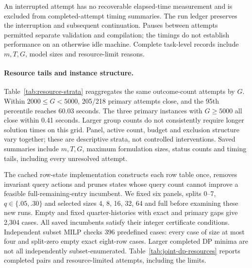 An interrupted attempt has no recoverable elapsed-time measurement and is excluded from completed-attempt timing summaries. The run ledger preserves the interruption and subsequent continuation. Pauses between attempts permitted separate validation and compilation; the timings do not establish performance on an otherwise idle machine. Complete task-level records include $m,T,G$, model sizes and resource-limit reasons.


\paragraph{Resource tails and instance structure.}
Table~\ref{tab:resource-strata} reaggregates the same outcome-count attempts by $G$. Within $2000\le G<5000$, 205/218 primary attempts close, and the 95th percentile reaches 60.03 seconds. The three primary instances with $G\ge5000$ all close within 0.41 seconds. Larger group counts do not consistently require longer solution times on this grid. Panel, active count, budget and exclusion structure vary together; these are descriptive strata, not controlled interventions. Saved summaries include $m,T,G$, maximum formulation sizes, status counts and timing tails, including every unresolved attempt.




The cached row-state implementation constructs each row table once, removes invariant query actions and prunes states whose query count cannot improve a feasible full-remaining-entry incumbent. We fixed six panels, splits 0--7, $q\in\{.05,.30\}$ and selected sizes 4, 8, 16, 32, 64 and full before examining these new runs. Empty and fixed quarter-histories with exact and primary gaps give 2,304 cases. All saved incumbents satisfy their integer certificate conditions. Independent subset MILP checks 396 predefined cases: every case of size at most four and split-zero empty exact eight-row cases. Larger completed DP minima are not all independently subset-enumerated. Table~\ref{tab:joint-dp-resources} reports completed pairs and resource-limited attempts, including the limits.


